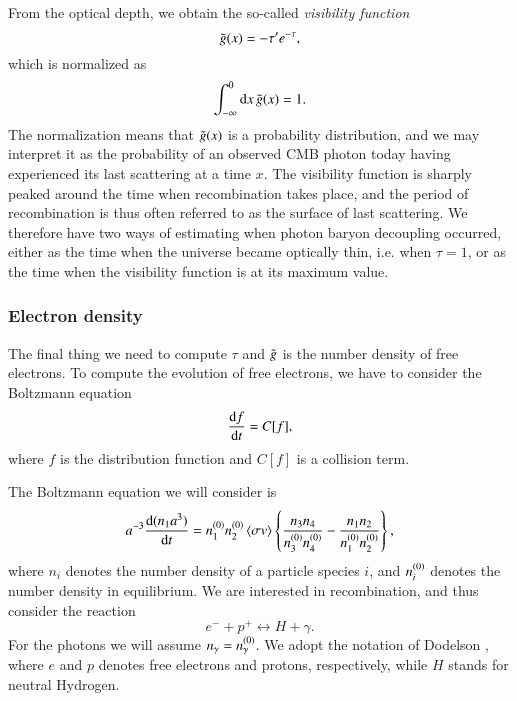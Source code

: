From the optical depth, we obtain the so-called \textit{visibility function} \cite[Eq. (8)]{callin} 
\begin{equation} \label{eq:M2:theory:g_tilde_of_x_definition}
    \gx = -\tau' e^{-\tau},
\end{equation}
which is normalized as 
\begin{equation} \label{eq:M2:theory:g_tilde_normalization}
    \int_{-\infty}^0\dd x\,\gx = 1.
\end{equation}
The normalization means that $\gx$ is a probability distribution, and we may interpret it as the probability of an observed CMB photon today having experienced its last scattering at a time $x$. The visibility function is sharply peaked around the time when recombination takes place, and the period of recombination is thus often referred to as the surface of last scattering. We therefore have two ways of estimating when photon baryon decoupling occurred, either as the time when the universe became optically thin, i.e. when $\tau=1$, or as the time when the visibility function is at its maximum value.

\subsubsection{Electron density } \label{sssec:M2_electron_density}
The final thing we need to compute $\tau$ and $\g$ is the number density of free electrons. To compute the evolution of free electrons, we have to consider the Boltzmann equation \cite[Eq. (3.19)]{Dodelson}
\begin{equation} \label{eq:M2:theory:Boltzmann_equation}
    \dv{f}{t} = C[f],
\end{equation}
where $f$ is the distribution function and $C[f]$ is a collision term. 

The Boltzmann equation we will consider is \cite[Eq. (4.8)]{Dodelson} 
\begin{equation} \label{eq:M2:theory:Boltzmann_equation_four_particles_scale_factor}
    a^{-3}\dv{(n_1 a^3)}{t} = \equilibriumn[1] \equilibriumn[2] \expval{\sigma v} \BBclosed{\frac{n_3 n_4}{\equilibriumn[3] \equilibriumn[4]} - \frac{n_1 n_2}{\equilibriumn[1] \equilibriumn[2]}},
\end{equation}
where $n_i$ denotes the number density of a particle species $i$, and $\equilibriumn[i]$ denotes the number density in equilibrium. We are interested in recombination, and thus consider the reaction 
\begin{equation} \label{eq:M2:theory:electron_proton_to_hydrogen_photon}
    e^- + p^+ \leftrightarrow H + \gamma.
\end{equation}   
For the photons we will assume $n_\gamma = \equilibriumn[\gamma]$. We adopt the notation of Dodelson \cite{Dodelson}, where $e$ and $p$ denotes free electrons and protons, respectively, while $H$ stands for neutral Hydrogen. 


